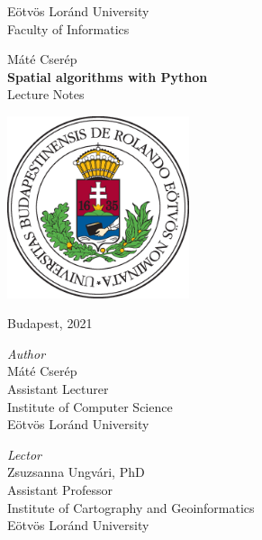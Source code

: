 \documentclass{article}
\begin{document}
\begin{center}
	{\LARGE E\"otv\"os Lor\'and University}\\[0.7cm]
	{\Large Faculty of Informatics}
	
	\vspace{3.0cm}
	
	{\sc \LARGE M\'at\'e Cser\'ep}\\[1.2cm]
	{\bf \huge Spatial algorithms with Python}\\[1.2cm]
	{\Large Lecture Notes}
	
	\vspace{2.0cm}
	
	\includegraphics[width=0.4\textwidth]{elte_cimer_szines}
	
	\vfill
	
	{\Large Budapest, 2021}
\end{center}

\newpage

\begin{center}
	{\it \large Author}\\[0.7cm]
	{\sc \Large M\'at\'e Cser\'ep}\\[0.3cm]
	{\large Assistant Lecturer}\\[0.5cm]
	{\large Institute of Computer Science}\\[0.3cm]
	{\large E\"otv\"os Lor\'and University}
	
	\vspace{2.0cm}
	
	{\it \large Lector}\\[0.7cm]
	{\Large {\sc Zsuzsanna Ungv\'ari}, PhD}\\[0.3cm]
	{\large Assistant Professor}\\[0.5cm]
	{\large Institute of Cartography and Geoinformatics}\\[0.3cm]
	{\large E\"otv\"os Lor\'and University}
\end{center}
\end{document}
